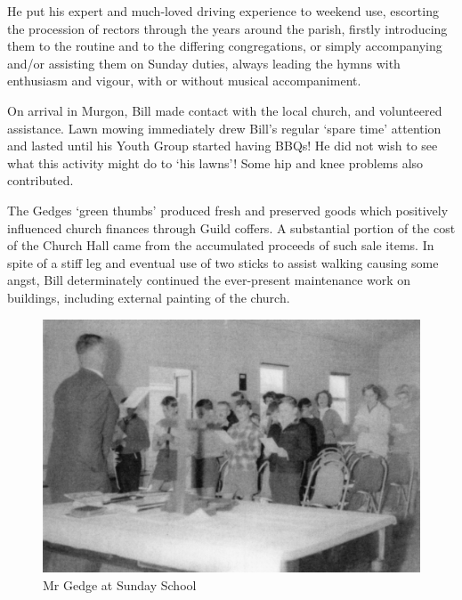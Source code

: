 He put his expert and much-loved driving experience to weekend use, escorting the procession of rectors through the years around the parish, firstly introducing them to the routine and to the differing congregations, or simply accompanying and/or assisting them on Sunday duties, always leading the hymns with enthusiasm and vigour, with or without musical accompaniment.



On arrival in Murgon, Bill made contact with the local church, and volunteered assistance. Lawn mowing immediately drew Bill's regular `spare time' attention and lasted until his Youth Group started having BBQs! He did not wish to see what this activity might do to `his lawns'! Some hip and knee problems also contributed.



The Gedges `green thumbs' produced fresh and preserved goods which positively influenced church finances through Guild coffers. A substantial portion of the cost of the Church Hall came from the accumulated proceeds of such sale items. In spite of a stiff leg and eventual use of two sticks to assist walking causing some angst, Bill determinately continued the ever-present maintenance work on buildings, including external painting of the church.









\begin{figure}
\begin{center}
\includegraphics[width=1.\linewidth,center]{../images/gedgeSundaySchool.jpg}
\caption{Mr Gedge at Sunday School}
\end{center}
\end{figure}




